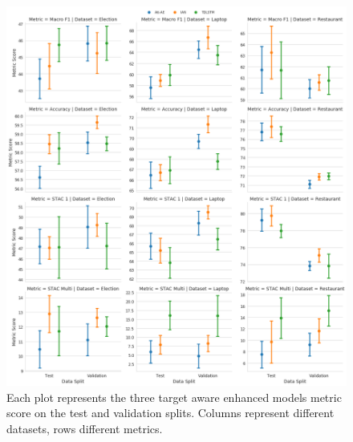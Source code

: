 \begin{figure}[!h]
    \centering
    \includegraphics[scale=0.3]{images/augmentation/methods_performance/Inter_Target/overall_inter_target_scores.png}
    \caption{Each plot represents the three target aware enhanced models metric score on the test and validation splits. Columns represent different datasets, rows different metrics.}
    \label{fig:aug_overall_inter_target_scores.png}
\end{figure}
